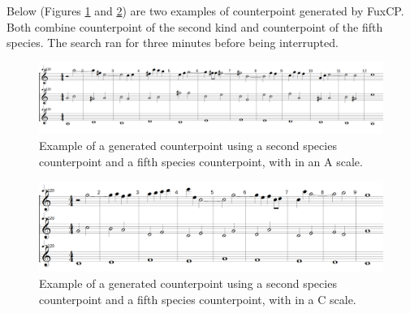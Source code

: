 Below (Figures \ref{fig:musicality-5sp-la} and \ref{fig:musicality-5sp-do}) are two examples of counterpoint generated by FuxCP. Both combine counterpoint of the second kind and counterpoint of the fifth species. The search ran for three minutes before being interrupted.

\begin{figure}[h]
    \centering
    \includegraphics[width=1\textwidth]{Images/Musicality/musicality-5sp-la.png}
    \caption{Example of a generated counterpoint using a second species counterpoint and a fifth species counterpoint, with in an A scale.}
    \label{fig:musicality-5sp-la}
\end{figure}

\begin{figure}[h]
    \centering
    \includegraphics[width=1\textwidth]{Images/Musicality/musicality-5sp-do.png}
    \caption{Example of a generated counterpoint using a second species counterpoint and a fifth species counterpoint, with in a C scale.}
    \label{fig:musicality-5sp-do}
\end{figure}